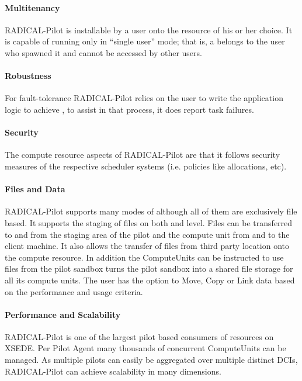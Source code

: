 \documentclass{sig-alternate}
\begin{document}
\paragraph{Multitenancy}

RADICAL-Pilot is installable by a user onto the resource of his or her choice.
It is capable of running only in ``single user'' mode; that is, a \pilot
belongs to the user who spawned it and cannot be accessed by other users.

\paragraph{Robustness}

For fault-tolerance RADICAL-Pilot relies on the user to write the application
logic to achieve , to assist in that process, it does report
task failures.

\paragraph{Security}
The compute resource  aspects of RADICAL-Pilot are that it
follows security measures of the respective scheduler systems (i.e. policies
like allocations, etc).

\paragraph{Files and Data}

RADICAL-Pilot supports many modes of  although all of
them are exclusively file based.
It supports the staging of files on both \pilot and  level.
Files can be transferred to and from the staging area of the pilot and the
compute unit  from and to the client machine.
It also allows the transfer of files from third party location onto the compute
resource.
In addition the ComputeUnits can be instructed to use files from the pilot
sandbox turns the pilot sandbox into a shared file storage for all its compute
units.
The user has the option to Move, Copy or Link data based on the performance and
usage criteria.

\paragraph{Performance and Scalability}

RADICAL-Pilot is one of the largest pilot based consumers of resources on
XSEDE\cite{}.
Per Pilot Agent many thousands of concurrent ComputeUnits can be managed.
As multiple pilots can easily be aggregated over multiple distinct DCIs,
RADICAL-Pilot can achieve scalability in many dimensions.
\end{document}

